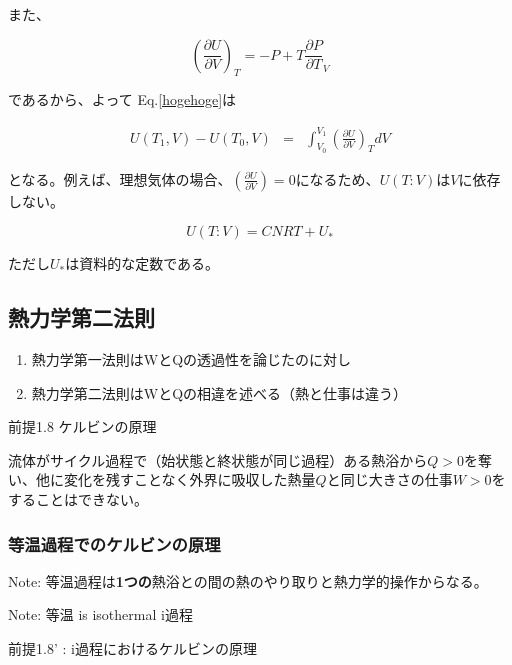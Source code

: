 また、

\begin{equation}
  \left(\frac{\partial U}{\partial V}\right)_T = -P + T \frac{\partial P}{\partial T}_V
\end{equation}

であるから、よって Eq.\ref{hogehoge}は

\begin{eqnarray}
  U(T_1, V) - U(T_0, V) 
     &=& \int_{V_0}^{V_1} \left(\frac{\partial U}{\partial V}\right)_T dV
  \label{hogehoge}
\end{eqnarray}

となる。例えば、理想気体の場合、$\left(\frac{\partial U}{\partial V}\right) = 0$になるため、$U(T:V)$は$V$に依存しない。

\begin{equation}
  U(T:V) = CNRT + U_*
\end{equation}

ただし$U_*$は資料的な定数である。

\subsection*{熱力学第二法則}

\begin{enumerate}
  \item 熱力学第一法則はWとQの透過性を論じたのに対し
  \item 熱力学第二法則はWとQの相違を述べる（熱と仕事は違う）
\end{enumerate}

前提1.8 ケルビンの原理

流体がサイクル過程で（始状態と終状態が同じ過程）ある熱浴から$Q>0$を奪い、他に変化を残すことなく外界に吸収した熱量$Q$と同じ大きさの仕事$W>0$をすることはできない。

\subsubsection{等温過程でのケルビンの原理}

Note: 等温過程は\textbf{1つの}熱浴との間の熱のやり取りと熱力学的操作からなる。

Note: 等温 is isothermal \rightarrow i過程

前提1.8' : i過程におけるケルビンの原理